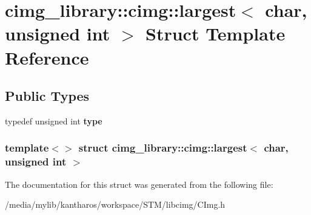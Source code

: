 \hypertarget{structcimg__library_1_1cimg_1_1largest_3_01char_00_01unsigned_01int_01_4}{
\section{cimg\_\-library::cimg::largest$<$ char, unsigned int $>$ Struct Template Reference}
\label{structcimg__library_1_1cimg_1_1largest_3_01char_00_01unsigned_01int_01_4}
}
\subsection*{Public Types}
\begin{DoxyCompactItemize}
\item 
\hypertarget{structcimg__library_1_1cimg_1_1largest_3_01char_00_01unsigned_01int_01_4_a66c6172bd45d98f56badea4006780ced}{
typedef unsigned int {\bfseries type}}
\label{structcimg__library_1_1cimg_1_1largest_3_01char_00_01unsigned_01int_01_4_a66c6172bd45d98f56badea4006780ced}

\end{DoxyCompactItemize}
\subsubsection*{template$<$$>$ struct cimg\_\-library::cimg::largest$<$ char, unsigned int $>$}



The documentation for this struct was generated from the following file:\begin{DoxyCompactItemize}
\item 
/media/mylib/kantharos/workspace/STM/libcimg/CImg.h\end{DoxyCompactItemize}

